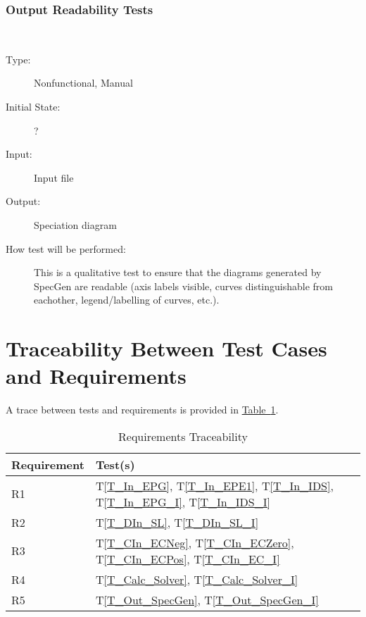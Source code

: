 \documentclass[12pt, titlepage]{article}
\newcommand{\progname}{SpecGen}
\newcounter{testnum} %
\newcommand{\testref}[1]{T\ref{#1}}
\begin{document}
\subsubsection{Output Readability Tests}
		
\noindent {\bf }
\begin{addmargin}[2em]{0em}
\\
\begin{addmargin}[2em]{0em}
\begin{description}
\item[Type:] Nonfunctional, Manual
					
\item[Initial State:] ?
					
\item[Input:] Input file
					
\item[Output:] Speciation diagram
					
\item[How test will be performed:] This is a qualitative test to ensure that the 
diagrams generated by \progname{} are readable (axis labels visible, curves 
distinguishable from eachother, legend/labelling of curves, etc.).\\
\end{description}
\end{addmargin}

\end{addmargin}

\newpage
\section{Traceability Between Test Cases and Requirements}
A trace between tests and requirements is provided in 
\hyperref[tab:reqtrace]{Table~\ref*{tab:reqtrace}}.

\begin{table}[h]
\caption{Requirements Traceability} \label{tab:reqtrace}
\centering
\begin{tabularx}{0.55\textwidth}{p{4cm}X}
\toprule {\bf Requirement} & {\bf Test(s)}\\
\midrule
R1	&	\testref{T_In_EPG}, \testref{T_In_EPE1}, \testref{T_In_IDS}, 
      \testref{T_In_EPG_I}, \testref{T_In_IDS_I}\\
R2	&	\testref{T_DIn_SL}, \testref{T_DIn_SL_I}\\
R3	&	\testref{T_CIn_ECNeg}, \testref{T_CIn_ECZero}, \testref{T_CIn_ECPos}, 
      \testref{T_CIn_EC_I}\\
R4	&	\testref{T_Calc_Solver}, \testref{T_Calc_Solver_I}\\
R5	&	\testref{T_Out_SpecGen}, \testref{T_Out_SpecGen_I}\\
\bottomrule
\end{tabularx}
\end{table}
\end{document}
